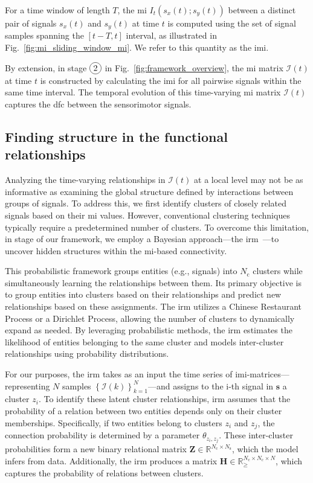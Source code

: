 For a time window of length $T$, the \ac{mi} $I_t(s_x(t);s_y(t))$ between a distinct pair of signals $s_x(t)$ and $s_y(t)$ at time $t$ is computed using the set of signal samples spanning the $\left[t-T,t\right]$ interval, as illustrated in Fig.~\ref{fig:mi_sliding_window_mi}. We refer to this quantity as the \acf{imi}. 

By extension, in stage $\circled{2}$ in Fig.~\ref{fig:framework_overview}, the \ac{mi} matrix $\bm{\mathcal{I}}(t)$ at time $t$ is constructed by calculating the \ac{imi} for all pairwise signals within the same time interval. The temporal evolution of this time-varying \ac{mi} matrix $\bm{\mathcal{I}}(t)$ captures the \ac{dfc} between the sensorimotor signals.

\subsection{Finding structure in the functional relationships}\label{sec:the_irm}
Analyzing the time-varying relationships in $\bm{\mathcal{I}}(t)$ at a local level may not be as informative as examining the global structure defined by interactions between groups of signals. To address this, we first identify clusters of closely related signals based on their \ac{mi} values. However, conventional clustering techniques typically require a predetermined number of clusters. To overcome this limitation, in stage  of our framework, we employ a Bayesian approach---the \ac{irm}~\cite{Moerup2012}---to uncover hidden structures within the \ac{mi}-based connectivity.

This probabilistic framework groups entities (e.g., signals) into $N_\text{c}$ clusters while simultaneously learning the relationships between them. Its primary objective is to group entities into clusters based on their relationships and predict new relationships based on these assignments. The \ac{irm} utilizes a Chinese Restaurant Process or a Dirichlet Process, allowing the number of clusters to dynamically expand as needed. By leveraging probabilistic methods, the \ac{irm} estimates the likelihood of entities belonging to the same cluster and models inter-cluster relationships using probability distributions.

For our purposes, the \ac{irm} takes as an input the time series of  \ac{imi}-matrices---representing $N$ samples $\left\lbrace \bm{\mathcal{I}}(k)\right\rbrace^{N}_{k=1}$---and assigns to the i-th signal in $\bm{s}$ a cluster $z_i$. To identify these latent cluster relationships, \ac{irm} assumes that the probability of a relation between two entities depends only on their cluster memberships. Specifically, if two entities belong to clusters $z_i$ and $z_j$, the connection probability is determined by a parameter $\theta_{z_i,z_j}$. These inter-cluster probabilities form a new binary relational matrix $\bm{Z}\in \mathbb{R}^{N_\text{c}\times N_\text{s}}$, which the model infers from data. Additionally, the \ac{irm} produces a matrix $\bm{H}\in \mathbb{R}^{N_\text{c}\times N_\text{c} \times N}_{\geq}$, which captures the probability of relations between clusters.

